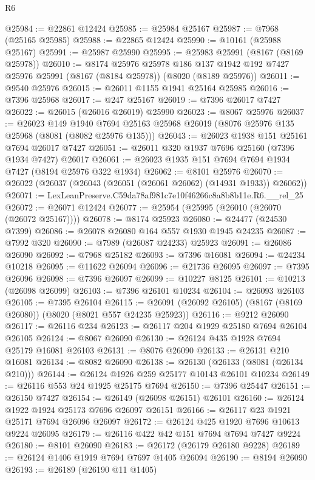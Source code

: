 \begin{lexlean}{R6}
\begin{coremodule}
@25984 := @22861 @12424
@25985 := @25984 @25167
@25987 := @7968 (@25165 @25985)
@25988 := @22865 @12424
@25990 := @10161 (@25988 @25167)
@25991 := @25987 @25990
@25995 := @25983 @25991 (@8167 (@8169 @25978))
@26010 := @8174
    @25976
    @25978
    @186
    @137
    @1942
    @192
    @7427
    @25976
    @25991
    (@8167 (@8184 @25978))
    (@8020 (@8189 @25976))
@26011 := @9540 @25976
@26015 := @26011 @1155 @1941 @25164 @25985
@26016 := @7396 @25968
@26017 := @247 @25167
@26019 := @7396 @26017 @7427
@26022 := @26015 (@26016 @26019) @25990
@26023 := @8067 @25976
@26037 := @26023
    @149
    @1940
    @7694
    @25163
    @25968
    @26019
    (@8076 @25976 @135 @25968 (@8081 (@8082 @25976 @135)))
@26043 := @26023 @1938 @151 @25161 @7694 @26017 @7427
@26051 := @26011 @320 @1937 @7696 @25160 (@7396 @1934 @7427) @26017
@26061 := @26023 @1935 @151 @7694 @7694 @1934 @7427 (@8194 @25976 @322 @1934)
@26062 := @8101 @25976
@26070 := @26022 (@26037 (@26043 (@26051 (@26061 @26062) (@14931 @1933)) @26062))
@26071 := LexLeanPreserve.C59da78af981c7e10f46266c8a8b8b11e.R6.__rel_25
@26072 := @26071 @12424
@26077 := @25954 (@25995 (@26010 (@26070 (@26072 @25167))))
@26078 := @8174 @25923
@26080 := @24477 (@24530 @7399)
@26086 := @26078 @26080 @164 @557 @1930 @1945 @24235
@26087 := @7992 @320
@26090 := @7989 (@26087 @24233) @25923
@26091 := @26086 @26090
@26092 := @7968 @25182
@26093 := @7396 @16081
@26094 := @24234 @10218
@26095 := @11622 @26094
@26096 := @21736 @26095
@26097 := @7395 @26096
@26098 := @7396 @26097
@26099 := @10227 @8125
@26101 := @10213 (@26098 @26099)
@26103 := @7396 @26101 @10234
@26104 := @26093 @26103
@26105 := @7395 @26104
@26115 := @26091 (@26092 @26105) (@8167 (@8169 @26080)) (@8020 (@8021 @557 @24235 @25923))
@26116 := @9212 @26090
@26117 := @26116 @234
@26123 := @26117 @204 @1929 @25180 @7694 @26104 @26105
@26124 := @8067 @26090
@26130 := @26124 @435 @1928 @7694 @25179 @16081 @26103
@26131 := @8076 @26090
@26133 := @26131 @210 @16081
@26134 := @8082 @26090
@26138 := @26130 (@26133 (@8081 (@26134 @210)))
@26144 := @26124 @1926 @259 @25177 @10143 @26101 @10234
@26149 := @26116 @553 @24 @1925 @25175 @7694
@26150 := @7396 @25447
@26151 := @26150 @7427
@26154 := @26149 (@26098 @26151) @26101
@26160 := @26124 @1922 @1924 @25173 @7696 @26097 @26151
@26166 := @26117 @23 @1921 @25171 @7694 @26096 @26097
@26172 := @26124 @425 @1920 @7696 @10613 @9224 @26095
@26179 := @26116 @422 @42 @151 @7694 @7694 @7427 @9224
@26180 := @8101 @26090
@26183 := @26172 (@26179 @26180 @9228)
@26189 := @26124 @1406 @1919 @7694 @7697 @1405 @26094
@26190 := @8194 @26090
@26193 := @26189 (@26190 @11 @1405)

\end{coremodule}
\end{lexlean}
